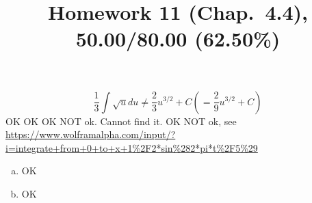 \documentclass[10pt]{article} %
\title{Homework 11 (Chap.~4.4),
50.00/80.00 (62.50\%)
}
\begin{document}
\maketitle

\begin{equation*}
	\frac{1}{3}\int \sqrt{u}du\neq \frac{2}{3}u^{3/2}+C \left( =\frac{2}{9}u^{3/2}+C \right)
\end{equation*}
OK
OK
OK
NOT ok. Cannot find it.
OK
NOT ok, see \url{https://www.wolframalpha.com/input/?i=integrate+from+0+to+x+1\%2F2*sin\%282*pi*t\%2F5\%29}
\begin{enumerate}[(a)]
	\item OK
	\item OK
\end{enumerate}
\end{document}
